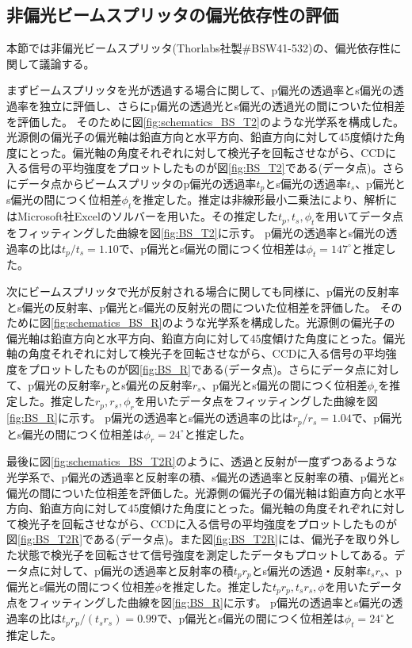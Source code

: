 \subsection{非偏光ビームスプリッタの偏光依存性の評価}
\label{seq:BS_characterization}
本節では非偏光ビームスプリッタ(Thorlabs社製\#BSW41-532)の、偏光依存性に関して議論する。

まずビームスプリッタを光が透過する場合に関して、p偏光の透過率とs偏光の透過率を独立に評価し、さらにp偏光の透過光とs偏光の透過光の間についた位相差を評価した。
そのために図\ref{fig:schematics_BS_T2}のような光学系を構成した。光源側の偏光子の偏光軸は鉛直方向と水平方向、鉛直方向に対して45度傾けた角度にとった。偏光軸の角度それぞれに対して検光子を回転させながら、CCDに入る信号の平均強度をプロットしたものが図\ref{fig:BS_T2}である(データ点)。さらにデータ点からビームスプリッタのp偏光の透過率$t_p$とs偏光の透過率$t_s$、p偏光とs偏光の間につく位相差$\phi_t$を推定した。推定は非線形最小二乗法により、解析にはMicrosoft社Excelのソルバーを用いた。その推定した$t_p,t_s,\phi_t$を用いてデータ点をフィッティングした曲線を図\ref{fig:BS_T2}に示す。
p偏光の透過率とs偏光の透過率の比は$t_p/t_s=1.10$で、p偏光とs偏光の間につく位相差は$\phi_t=147^\circ$と推定した。

次にビームスプリッタで光が反射される場合に関しても同様に、p偏光の反射率とs偏光の反射率、p偏光とs偏光の反射光の間についた位相差を評価した。
そのために図\ref{fig:schematics_BS_R}のような光学系を構成した。光源側の偏光子の偏光軸は鉛直方向と水平方向、鉛直方向に対して45度傾けた角度にとった。偏光軸の角度それぞれに対して検光子を回転させながら、CCDに入る信号の平均強度をプロットしたものが図\ref{fig:BS_R}である(データ点)。さらにデータ点に対して、p偏光の反射率$r_p$とs偏光の反射率$r_s$、p偏光とs偏光の間につく位相差$\phi_r$を推定した。推定した$r_p,r_s,\phi_r$を用いたデータ点をフィッティングした曲線を図\ref{fig:BS_R}に示す。
p偏光の透過率とs偏光の透過率の比は$r_p/r_s=1.04$で、p偏光とs偏光の間につく位相差は$\phi_r=24^\circ$と推定した。

最後に図\ref{fig:schematics_BS_T2R}のように、透過と反射が一度ずつあるような光学系で、p偏光の透過率と反射率の積、s偏光の透過率と反射率の積、p偏光とs偏光の間についた位相差を評価した。光源側の偏光子の偏光軸は鉛直方向と水平方向、鉛直方向に対して45度傾けた角度にとった。偏光軸の角度それぞれに対して検光子を回転させながら、CCDに入る信号の平均強度をプロットしたものが図\ref{fig:BS_T2R}である(データ点)。また図\ref{fig:BS_T2R}には、偏光子を取り外した状態で検光子を回転させて信号強度を測定したデータもプロットしてある。データ点に対して、p偏光の透過率と反射率の積$t_pr_p$とs偏光の透過・反射率$t_sr_s$、p偏光とs偏光の間につく位相差$\phi$を推定した。推定した$t_pr_p,t_sr_s,\phi$を用いたデータ点をフィッティングした曲線を図\ref{fig:BS_R}に示す。
p偏光の透過率とs偏光の透過率の比は$t_pr_p/(t_sr_s)=0.99$で、p偏光とs偏光の間につく位相差は$\phi_t=24^\circ$と推定した。

